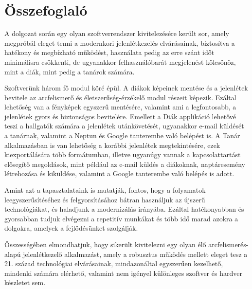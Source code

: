 \chapter{Összefoglaló} \label{chapter9}

A dolgozat során egy olyan szoftverrendszer kivitelezésére került sor, amely megpróbál eleget tenni a modernkori jelenlétkezelés elvárásainak, biztosítva a hatékony és megbízható működést, használata pedig az erre szánt időt minimálisra csökkenti, de ugyanakkor felhasználóbarát megjelenést kölcsönöz, mint a diák, mint pedig a tanárok számára.

Szoftverünk három fő modul köré épül. A diákok képeinek mentése és a jelenlétek bevitele az arcfelismerő és életszerűség-érzékelő modul részeit képezik. Ezáltal lehetőség van a fényképek egyszerű mentésére, valamint ami a legfontosabb, a jelenlétek gyors és biztonságos bevitelére. Emellett a Diák applikáció lehetővé teszi a hallgatók számára a jelenlétek utánkövetését, ugyanakkor e-mail küldését a tanárnak, valamint a Neptun és Google tanterembe való belépést is. A Tanár alkalmazásban is van lehetőség a korábbi jelenlétek megtekintésére, ezek kiexportálására több formátumban, illetve ugyanúgy vannak a kapcsolattartást elősegítő megoldások, mint például az e-mail küldés a diákoknak, naptáresemény létrehozása és kiküldése, valamint a Google tanterembe való belépés is adott. 

Amint azt a tapasztalataink is mutatják, fontos, hogy a folyamatok leegyszerűsítéséhez és felgyorsításához bátran használjuk az újszerű technológiákat, és haladjunk a modernizálás irányába. Ezáltal hatékonyabban és gyorsabban tudjuk elvégezni a repetitív munkákat és több idő marad azokra a dolgokra, amelyek a fejlődésünket szolgálják.

Összességében elmondhatjuk, hogy sikerült kivitelezni egy olyan élő arcfelismerés-alapú jelenlétkezelő alkalmazást, amely a robusztus működés mellett eleget tesz a 21. század technológiai elvárásainak, mindazonáltal egyszerűen kezelhető, mindenki számára elérhető, valamint nem igényel különleges szoftver és hardver készletet sem.
